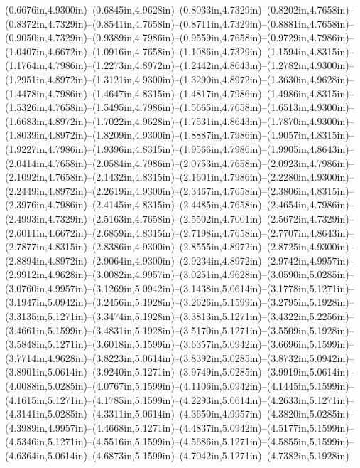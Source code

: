 (0.6676in,4.9300in)--(0.6845in,4.9628in)--(0.8033in,4.7329in)--(0.8202in,4.7658in)--(0.8372in,4.7329in)--(0.8541in,4.7658in)--(0.8711in,4.7329in)--(0.8881in,4.7658in)--(0.9050in,4.7329in)--(0.9389in,4.7986in)--(0.9559in,4.7658in)--(0.9729in,4.7986in)--(1.0407in,4.6672in)--(1.0916in,4.7658in)--(1.1086in,4.7329in)--(1.1594in,4.8315in)--(1.1764in,4.7986in)--(1.2273in,4.8972in)--(1.2442in,4.8643in)--(1.2782in,4.9300in)--(1.2951in,4.8972in)--(1.3121in,4.9300in)--(1.3290in,4.8972in)--(1.3630in,4.9628in)--(1.4478in,4.7986in)--(1.4647in,4.8315in)--(1.4817in,4.7986in)--(1.4986in,4.8315in)--(1.5326in,4.7658in)--(1.5495in,4.7986in)--(1.5665in,4.7658in)--(1.6513in,4.9300in)--(1.6683in,4.8972in)--(1.7022in,4.9628in)--(1.7531in,4.8643in)--(1.7870in,4.9300in)--(1.8039in,4.8972in)--(1.8209in,4.9300in)--(1.8887in,4.7986in)--(1.9057in,4.8315in)--(1.9227in,4.7986in)--(1.9396in,4.8315in)--(1.9566in,4.7986in)--(1.9905in,4.8643in)--(2.0414in,4.7658in)--(2.0584in,4.7986in)--(2.0753in,4.7658in)--(2.0923in,4.7986in)--(2.1092in,4.7658in)--(2.1432in,4.8315in)--(2.1601in,4.7986in)--(2.2280in,4.9300in)--(2.2449in,4.8972in)--(2.2619in,4.9300in)--(2.3467in,4.7658in)--(2.3806in,4.8315in)--(2.3976in,4.7986in)--(2.4145in,4.8315in)--(2.4485in,4.7658in)--(2.4654in,4.7986in)--(2.4993in,4.7329in)--(2.5163in,4.7658in)--(2.5502in,4.7001in)--(2.5672in,4.7329in)--(2.6011in,4.6672in)--(2.6859in,4.8315in)--(2.7198in,4.7658in)--(2.7707in,4.8643in)--(2.7877in,4.8315in)--(2.8386in,4.9300in)--(2.8555in,4.8972in)--(2.8725in,4.9300in)--(2.8894in,4.8972in)--(2.9064in,4.9300in)--(2.9234in,4.8972in)--(2.9742in,4.9957in)--(2.9912in,4.9628in)--(3.0082in,4.9957in)--(3.0251in,4.9628in)--(3.0590in,5.0285in)--(3.0760in,4.9957in)--(3.1269in,5.0942in)--(3.1438in,5.0614in)--(3.1778in,5.1271in)--(3.1947in,5.0942in)--(3.2456in,5.1928in)--(3.2626in,5.1599in)--(3.2795in,5.1928in)--(3.3135in,5.1271in)--(3.3474in,5.1928in)--(3.3813in,5.1271in)--(3.4322in,5.2256in)--(3.4661in,5.1599in)--(3.4831in,5.1928in)--(3.5170in,5.1271in)--(3.5509in,5.1928in)--(3.5848in,5.1271in)--(3.6018in,5.1599in)--(3.6357in,5.0942in)--(3.6696in,5.1599in)--(3.7714in,4.9628in)--(3.8223in,5.0614in)--(3.8392in,5.0285in)--(3.8732in,5.0942in)--(3.8901in,5.0614in)--(3.9240in,5.1271in)--(3.9749in,5.0285in)--(3.9919in,5.0614in)--(4.0088in,5.0285in)--(4.0767in,5.1599in)--(4.1106in,5.0942in)--(4.1445in,5.1599in)--(4.1615in,5.1271in)--(4.1785in,5.1599in)--(4.2293in,5.0614in)--(4.2633in,5.1271in)--(4.3141in,5.0285in)--(4.3311in,5.0614in)--(4.3650in,4.9957in)--(4.3820in,5.0285in)--(4.3989in,4.9957in)--(4.4668in,5.1271in)--(4.4837in,5.0942in)--(4.5177in,5.1599in)--(4.5346in,5.1271in)--(4.5516in,5.1599in)--(4.5686in,5.1271in)--(4.5855in,5.1599in)--(4.6364in,5.0614in)--(4.6873in,5.1599in)--(4.7042in,5.1271in)--(4.7382in,5.1928in) 